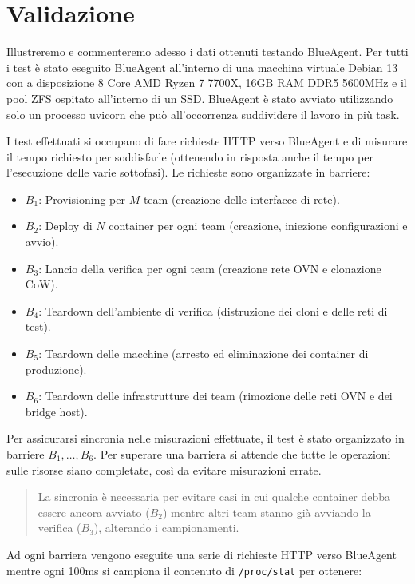 \section{Validazione}\label{validazione}

Illustreremo e commenteremo adesso i dati ottenuti testando BlueAgent.
Per tutti i test è stato eseguito BlueAgent all'interno di una macchina
virtuale Debian 13 con a disposizione 8 Core AMD Ryzen 7 7700X, 16GB RAM
DDR5 5600MHz e il pool ZFS ospitato all'interno di un SSD. BlueAgent è
stato avviato utilizzando solo un processo uvicorn che può
all'occorrenza suddividere il lavoro in più task.

I test effettuati si occupano di fare richieste HTTP verso BlueAgent e
di misurare il tempo richiesto per soddisfarle (ottenendo in risposta
anche il tempo per l'esecuzione delle varie sottofasi). Le richieste
sono organizzate in barriere:

\begin{itemize}
\tightlist
\item
  \(B_{1}\): Provisioning per \(M\) team (creazione delle interfacce di
  rete).
\item
  \(B_{2}\): Deploy di \(N\) container per ogni team (creazione,
  iniezione configurazioni e avvio).
\item
  \(B_{3}\): Lancio della verifica per ogni team (creazione rete OVN e
  clonazione CoW).
\item
  \(B_{4}\): Teardown dell'ambiente di verifica (distruzione dei cloni e
  delle reti di test).
\item
  \(B_{5}\): Teardown delle macchine (arresto ed eliminazione dei
  container di produzione).
\item
  \(B_{6}\): Teardown delle infrastrutture dei team (rimozione delle
  reti OVN e dei bridge host).
\end{itemize}

Per assicurarsi sincronia nelle misurazioni effettuate, il test è stato
organizzato in barriere \(B_{1},\dots,B_{6}\). Per superare una barriera
si attende che tutte le operazioni sulle risorse siano completate, così
da evitare misurazioni errate.

\begin{quote}
La sincronia è necessaria per evitare casi in cui qualche container
debba essere ancora avviato (\(B_{2}\)) mentre altri team stanno già
avviando la verifica (\(B_{3}\)), alterando i campionamenti.
\end{quote}

Ad ogni barriera vengono eseguite una serie di richieste HTTP verso
BlueAgent mentre ogni 100ms si campiona il contenuto di
\passthrough{\lstinline!/proc/stat!} per ottenere:

